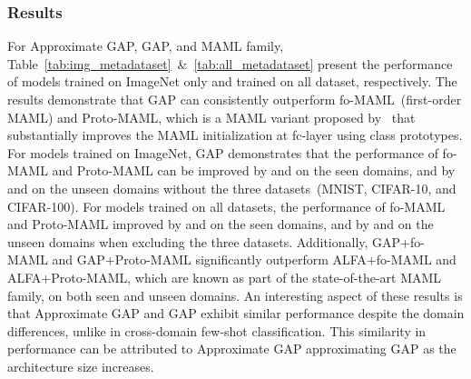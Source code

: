 \subsubsection{Results}
For Approximate GAP, GAP, and MAML family, Table~\ref{tab:img_metadataset}~\&~\ref{tab:all_metadataset} present the performance of models trained on ImageNet only and trained on all dataset, respectively. 
The results demonstrate that GAP can consistently outperform fo-MAML~(first-order MAML) and Proto-MAML, which is a MAML variant proposed by~\cite{triantafillou2019meta} that substantially improves the MAML initialization at fc-layer using class prototypes. 
For models trained on ImageNet, GAP demonstrates that the performance of fo-MAML and Proto-MAML can be improved by  and  on the seen domains, and by  and  on the unseen domains without the three datasets~(MNIST, CIFAR-10, and CIFAR-100).
For models trained on all datasets, the performance of fo-MAML and Proto-MAML improved by  and  on the seen domains, and by  and  on the unseen domains when excluding the three datasets. 
Additionally, GAP+fo-MAML and GAP+Proto-MAML significantly outperform ALFA+fo-MAML and ALFA+Proto-MAML, which are known as part of the state-of-the-art MAML family, on both seen and unseen domains. 
An interesting aspect of these results is that Approximate GAP and GAP exhibit similar performance despite the domain differences, unlike in cross-domain few-shot classification. 
This similarity in performance can be attributed to Approximate GAP approximating GAP as the architecture size increases.

